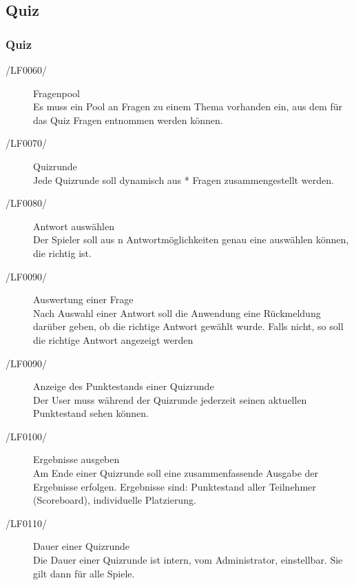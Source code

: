 \documentclass[11pt,a4paper]{scrreprt}
\begin{document}
\subsection{Quiz}

\subsubsection{Quiz}
\begin{description}
\item[/LF0060/] Fragenpool \\
Es muss ein Pool an Fragen zu einem Thema vorhanden ein, aus dem für das Quiz Fragen entnommen werden können.

\item[/LF0070/] Quizrunde \\
Jede Quizrunde soll dynamisch aus * Fragen zusammengestellt werden.

\item[/LF0080/] Antwort auswählen \\
Der Spieler soll aus n Antwortmöglichkeiten genau eine auswählen können, die richtig ist.
\item[/LF0090/]Auswertung einer Frage \\ 
Nach Auswahl einer Antwort soll die Anwendung eine Rückmeldung darüber geben, ob die richtige Antwort gewählt wurde. Falls nicht, so soll die richtige Antwort angezeigt werden %

\item[/LF0090/]Anzeige des Punktestands einer Quizrunde \\ 
Der User muss während der Quizrunde jederzeit seinen aktuellen Punktestand sehen können.

\item[/LF0100/] Ergebnisse ausgeben \\
Am Ende einer Quizrunde soll eine zusammenfassende Ausgabe der Ergebnisse erfolgen. Ergebnisse sind: Punktestand aller Teilnehmer (Scoreboard),  individuelle Platzierung.

\item[/LF0110/] Dauer einer Quizrunde \\
 Die Dauer einer Quizrunde ist intern, vom Administrator, einstellbar. Sie gilt dann für alle Spiele.
\end{description}
\end{document}
